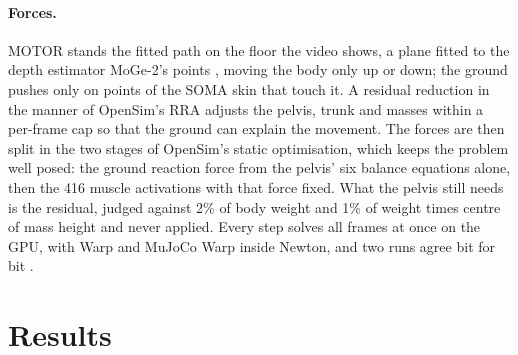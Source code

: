 \documentclass[11pt]{article}
\begin{document}
\paragraph{Forces.} MOTOR stands the fitted path on the floor the video shows, a plane fitted to the depth
estimator MoGe-2's points \cite{wang2025moge2}, moving the body only up or down; the ground pushes only on points of
the SOMA skin that touch it. A residual reduction in the manner of OpenSim's RRA \cite{delp2007opensim} adjusts the
pelvis, trunk and masses within a per-frame cap so that the ground can explain the movement. The forces are then
split in the two stages of OpenSim's static optimisation, which keeps the problem well posed: the ground reaction
force from the pelvis' six balance equations alone, then the 416 muscle activations with that force fixed. What the
pelvis still needs is the residual, judged against 2\% of body weight and 1\% of weight times centre of mass height
\cite{hicks2015model} and never applied. Every step solves all frames at once on the GPU, with Warp \cite{warp} and
MuJoCo Warp \cite{mujocowarp} inside Newton, and two runs agree bit for bit \cite{mujocowarp1835}.


\section{Results}
\label{sec:protocol}
\end{document}

